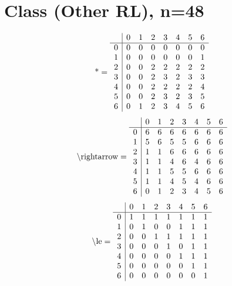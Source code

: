 \documentclass[11pt]{article}
\begin{document}
\section{Class (Other RL), n=48}
\[\text{*} = 
\begin{array}{r | r r r r r r r}
 & 0 & 1 & 2 & 3 & 4 & 5 & 6 \\ \hline
0 & 0 & 0 & 0 & 0 & 0 & 0 & 0 \\
1 & 0 & 0 & 0 & 0 & 0 & 0 & 1 \\
2 & 0 & 0 & 2 & 2 & 2 & 2 & 2 \\
3 & 0 & 0 & 2 & 3 & 2 & 3 & 3 \\
4 & 0 & 0 & 2 & 2 & 2 & 2 & 4 \\
5 & 0 & 0 & 2 & 3 & 2 & 3 & 5 \\
6 & 0 & 1 & 2 & 3 & 4 & 5 & 6 \\
\end{array}
\]
\[\text{\textbackslash rightarrow} = 
\begin{array}{r | r r r r r r r}
 & 0 & 1 & 2 & 3 & 4 & 5 & 6 \\ \hline
0 & 6 & 6 & 6 & 6 & 6 & 6 & 6 \\
1 & 5 & 6 & 5 & 5 & 6 & 6 & 6 \\
2 & 1 & 1 & 6 & 6 & 6 & 6 & 6 \\
3 & 1 & 1 & 4 & 6 & 4 & 6 & 6 \\
4 & 1 & 1 & 5 & 5 & 6 & 6 & 6 \\
5 & 1 & 1 & 4 & 5 & 4 & 6 & 6 \\
6 & 0 & 1 & 2 & 3 & 4 & 5 & 6 \\
\end{array}
\]
\[\text{\textbackslash le} = 
\begin{array}{r | r r r r r r r}
 & 0 & 1 & 2 & 3 & 4 & 5 & 6 \\ \hline
0 & 1 & 1 & 1 & 1 & 1 & 1 & 1 \\
1 & 0 & 1 & 0 & 0 & 1 & 1 & 1 \\
2 & 0 & 0 & 1 & 1 & 1 & 1 & 1 \\
3 & 0 & 0 & 0 & 1 & 0 & 1 & 1 \\
4 & 0 & 0 & 0 & 0 & 1 & 1 & 1 \\
5 & 0 & 0 & 0 & 0 & 0 & 1 & 1 \\
6 & 0 & 0 & 0 & 0 & 0 & 0 & 1 \\
\end{array}
\]
\end{document}
